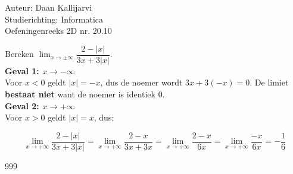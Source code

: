 \documentclass[a4paper]{article}
\begin{document}
\noindent \large Auteur: Daan Kallijarvi \\
\noindent \large Studierichting: Informatica\\
\noindent \large Oefeningenreeks 2D nr. 20.10\\

\medskip

\normalsize

Bereken $\displaystyle\lim_{x \to \pm\infty} \dfrac{2 - |x|}{3x + 3|x|}$.\\

\textbf{Geval 1: $x \to -\infty$}\\

Voor $x < 0$ geldt $|x| = -x$, dus de noemer wordt $3x + 3(-x) = 0$.
De limiet \textbf{bestaat niet} want de noemer is identiek $0$.\\

\textbf{Geval 2: $x \to +\infty$}\\

Voor $x > 0$ geldt $|x| = x$, dus:

$$\lim_{x \to +\infty} \dfrac{2 - |x|}{3x + 3|x|}
= \lim_{x \to +\infty} \dfrac{2 - x}{3x + 3x}
= \lim_{x \to +\infty} \dfrac{2 - x}{6x}
= \lim_{x \to +\infty} \dfrac{-x}{6x}
= -\dfrac{1}{6}$$

\begin{thebibliography}{999}
\end{thebibliography}
\end{document}
